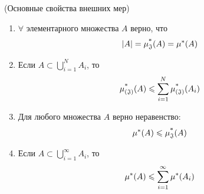 \begin{theorem} (Основные свойства внешних мер)
	\begin{enumerate}
		\item $\forall$ элементарного множества $A$ верно, что
		\[
			|A| = \operatorname{\mu^*_\mathfrak{J}}(A) = \mu^*(A)
		\]
		
		\item Если $A \subset \bigcup\limits_{i = 1}^N A_i$, то
		\[
			\operatorname{\mu^*_{(\mathfrak{J})}}(A) \leqslant \sum\limits_{i = 1}^N \operatorname{\mu^*_{(\mathfrak{J})}}(A_i)
		\]
		
		\item Для любого множества $A$ верно неравенство:
		\[
			\mu^*(A) \leqslant \operatorname{\mu^*_\mathfrak{J}}(A)
		\]
		
		\item Если $A \subset \bigcup_{i = 1}^\infty A_i$, то
		\[
			\mu^*(A) \leqslant \sum\limits_{i = 1}^\infty \mu^*(A_i)
		\]
	\end{enumerate}
\end{theorem}

